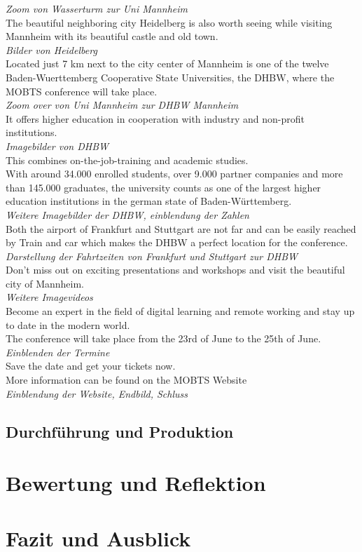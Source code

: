 \textit{Zoom von Wasserturm zur Uni Mannheim}\\
The beautiful neighboring city Heidelberg is also worth seeing while visiting Mannheim with its beautiful castle and old town.\\
\textit{Bilder von Heidelberg}\\ 
Located just 7 km next to the city center of Mannheim is one of the twelve Baden-Wuerttemberg Cooperative State Universities, the DHBW, where the MOBTS conference will take place.\\
\textit{Zoom over von Uni Mannheim zur DHBW Mannheim}\\
It offers higher education in cooperation with industry and non-profit institutions.\\
\textit{Imagebilder von DHBW}\\
This combines on-the-job-training and academic studies.\\
With around 34.000 enrolled students, over 9.000 partner companies and more than 145.000 graduates, the university counts as one of the largest higher education institutions in the german state of Baden-Württemberg.\\
\textit{Weitere Imagebilder der DHBW, einblendung der Zahlen}\\
Both the airport of Frankfurt and Stuttgart are not far and can be easily reached by Train and car which makes the DHBW a perfect location for the conference.\\
\textit{Darstellung der Fahrtzeiten von Frankfurt und Stuttgart zur DHBW}\\
Don’t miss out on exciting presentations and workshops and visit the beautiful city of Mannheim.\\
\textit{Weitere Imagevideos}\\
Become an expert in the field of digital learning and remote working and stay up to date in the modern world.\\ 
The conference will take place from the 23rd of June to the 25th of June.\\
\textit{Einblenden der Termine}\\
Save the date and get your tickets now.\\
More information can be found on the MOBTS Website\\
\textit{Einblendung der Website, Endbild, Schluss}

\subsection{Durchführung und Produktion}
\section{Bewertung und Reflektion}
\section{Fazit und Ausblick}